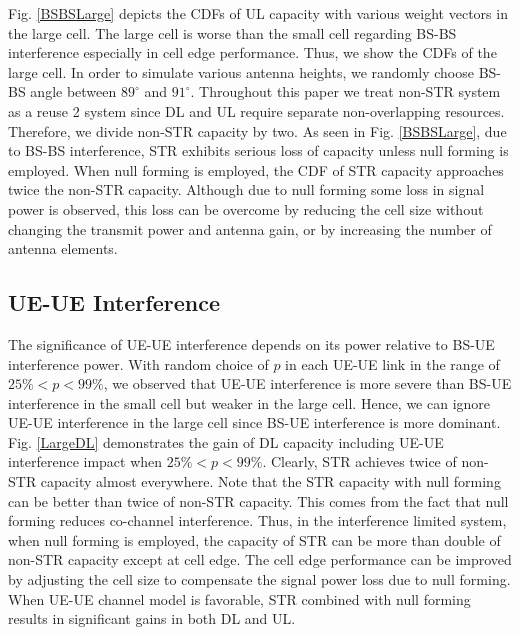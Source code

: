 \documentclass[twocolumn]{IEEEtran}
\begin{document}
Fig. \ref{BSBSLarge} depicts the CDFs of UL capacity with various
weight vectors in the large cell. The large cell is worse than the
small cell regarding BS-BS interference especially in cell edge
performance. Thus, we show the CDFs of the large cell. In order to
simulate various antenna heights, we randomly choose BS-BS angle
between $89^\circ$ and $91^\circ$. Throughout this paper we treat
non-STR system as a reuse 2 system since DL and UL require separate
non-overlapping resources. Therefore, we divide non-STR capacity by
two. As seen in Fig. \ref{BSBSLarge}, due to BS-BS interference, STR
exhibits serious loss of capacity unless null forming is employed.
When null forming is employed, the CDF of STR capacity approaches
twice the non-STR capacity. Although due to null forming some loss
in signal power is observed, this loss can be overcome by reducing
the cell size without changing the transmit power and antenna gain,
or by increasing the number of antenna elements.


\subsection{UE-UE Interference}

The significance of UE-UE interference depends on its power relative
to BS-UE interference power. With random choice of $p$ in each UE-UE
link in the range of $25\%<p<99\%$, we observed that UE-UE
interference is more severe than BS-UE interference in the small
cell but weaker in the large cell. Hence, we can ignore UE-UE
interference in the large cell since BS-UE interference is more
dominant. Fig. \ref{LargeDL} demonstrates the gain of DL capacity
including UE-UE interference impact when $25\%<p<99\%$. Clearly, STR
achieves twice of non-STR capacity almost everywhere. Note that the
STR capacity with null forming can be better than twice of non-STR
capacity. This comes from the fact that null forming reduces
co-channel interference. Thus, in the interference limited system,
when null forming is employed, the capacity of STR can be more than
double of non-STR capacity except at cell edge. The cell edge
performance can be improved by adjusting the cell size to compensate
the signal power loss due to null forming. When UE-UE channel model
is favorable, STR combined with null forming results in significant
gains in both DL and UL.
\end{document}
